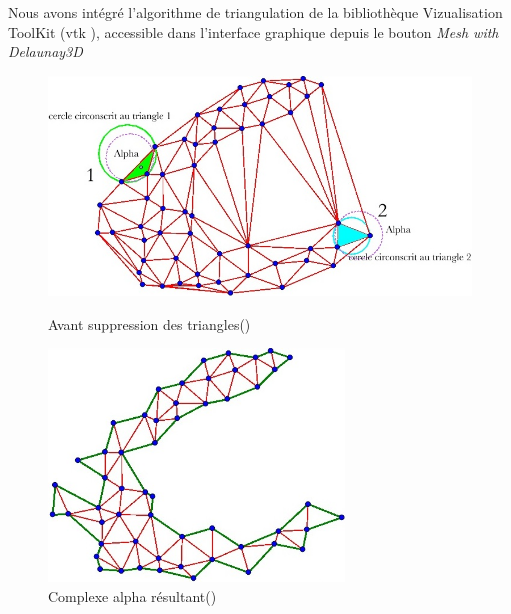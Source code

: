 \documentclass[a4paper,10pt]{report}
\begin{document}
Nous avons intégré l'algorithme de triangulation de la bibliothèque Vizualisation ToolKit (vtk \cite{vtk}), accessible dans l'interface graphique depuis le bouton \textit{Mesh with Delaunay3D}
\begin{figure}[h!]
\begin{minipage}{.5\textwidth}
	\centering
	\includegraphics[width=1.1\textwidth]{Delaunay-avant.jpg}
	\caption{Avant suppression des triangles(\cite{glace})}
    \label{Delaunay-avant}
\end{minipage}%
\begin{minipage}{.5\textwidth}
	\centering
	\includegraphics[width=0.7\textwidth]{Delaunay-apres.jpg}
	\caption{Complexe alpha résultant(\cite{glace})}
    \label{Delaunay-apres}
\end{minipage}
\end{figure}
\end{document}
